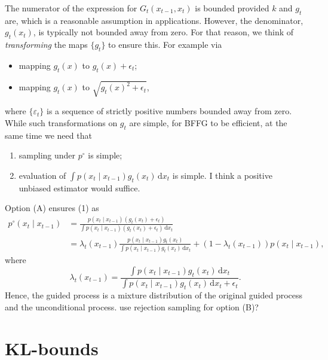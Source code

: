 \documentclass[11pt,reqno]{amsart}
\newcommand{\dd}{{\,\mathrm d}}
\newcommand{\eps}{\varepsilon}
\theoremstyle{definition}
\newcommand{\note}[1]{{\color{Red} #1}}
\begin{document}
The numerator of the expression for $G_t(x_{t-1},x_t)$ is bounded provided $k$ and $g_t$ are, which is a reasonable assumption in applications. However, the denominator, $g_t(x_t)$, is typically not bounded away from zero. For that reason, we think of {\it transforming} the maps $\{g_t\}$ to ensure this. For example via
\begin{itemize}
	\item[(A)] mapping $g_t(x)$ to $g_t(x)+\epsilon_t$;
	\item[(B)] mapping $g_t(x)$ to $\sqrt{g_t(x)^2+\epsilon_t}$,
\end{itemize}
where $\{\eps_t\}$ is a sequence of strictly positive numbers bounded away from zero. 
While such transformations on $g_t$ are simple, for BFFG to be efficient, at the same time we need that
\begin{enumerate}
	\item sampling under $p^\circ$ is simple;
	\item evaluation of $\int p(x_t\mid x_{t-1}) g_t(x_t) \dd x_t$ is simple. \note{I think a positive unbiased estimator would suffice.}
\end{enumerate}
Option (A) ensures (1) as
\begin{align*}
	 p^\circ(x_t \mid x_{t-1}) &=\frac{p(x_t \mid x_{t-1})(g_t(x_t)+\epsilon_t)}{\int p(x_t \mid x_{t-1})(g_t(x_t)+\epsilon_t) \dd x_t}\\& = \lambda_t(x_{t-1})\frac{p(x_t\mid x_{t-1}) g_t(x_t)}{\int p(x_t\mid x_{t-1}) g_t(x_t) \dd x_t}  + (1-\lambda_t(x_{t-1})) p(x_t\mid x_{t-1}), 
\end{align*}
where 
\[\lambda_t(x_{t-1})= \frac{\int p(x_t\mid x_{t-1}) g_t(x_t) \dd x_t}{\int p(x_t\mid x_{t-1}) g_t(x_t) \dd x_t+\epsilon_t}.\]
Hence, the guided process is a mixture distribution of the original guided process and the unconditional process.  \note{use rejection sampling for option (B)?}



\section{KL-bounds}
\end{document}
